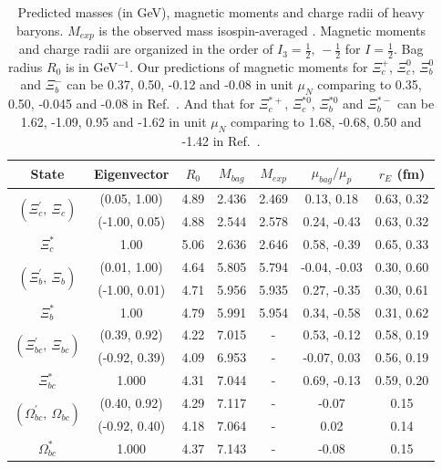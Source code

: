 \documentclass[12pt,prd,onecolumn,floatfix,nofootinbib]{revtex4}
\begin{document}
\renewcommand{\tabcolsep}{0.46cm} \renewcommand{\arraystretch}{1.1}
\begin{table}[!htb]
\caption{Predicted masses (in GeV), magnetic moments and charge radii of
heavy baryons. $M_{exp}$ is the observed mass isospin-averaged \protect\cite%
{Tanabashi:D18}. Magnetic moments and charge radii are organized in the
order of $I_{3}=\frac{1}{2},\,-\frac{1}{2}$ for $I=\frac{1}{2}$. Bag radius $%
R_{0}$ is in GeV$^{-1}$. Our predictions of magnetic moments for $\Xi_{c}^{+}$, 
$\Xi_{c}^{0}$, $\Xi_{b}^{0}$ and $\Xi_{b}^{-}$ can be 0.37, 0.50, -0.12 and 
-0.08 in unit $\mu_{N}$ comparing to 0.35, 0.50, -0.045 and -0.08 in Ref.~\cite%
{Aliev:2008ay}. And that for $\Xi_{c}^{\ast +}$, $\Xi_{c}^{\ast 0}$, 
$\Xi_{b}^{\ast 0}$ and $\Xi_{b}^{\ast -}$ can be 1.62, -1.09, 0.95 and -1.62 
in unit $\mu_{N}$ comparing to 1.68, -0.68, 0.50 and -1.42 in Ref.~\cite{Aliev:2008sk}.}
\label{tab:mixingbaryon}%
\begin{tabular}{ccccccc}
\hline\hline
\textrm{State} & \textrm{Eigenvector} & $R_{0}$ & $M_{bag}$ & $M_{exp}$ \cite%
{Tanabashi:D18} & $\mu_{bag}/\mu_{p}$ & $r_{E}$ (fm) \\ \hline
\multirow{2}{*}{$\left(\Xi_{c}^{\prime},\ \Xi_{c}\right)$} & (0.05, 1.00) &
4.89 & 2.436 & 2.469 & 0.13, 0.18 & 0.63, 0.32 \\
& (-1.00, 0.05) & 4.88 & 2.544 & 2.578 & 0.24, -0.43 & 0.63, 0.32 \\
$\Xi_{c}^{\ast}$ & 1.00 & 5.06 & 2.636 & 2.646 & 0.58, -0.39 & 0.65, 0.33 \\
\multirow{2}{*}{$\left(\Xi_{b}^{\prime},\ \Xi_{b}\right)$} & (0.01, 1.00) &
4.64 & 5.805 & 5.794 & -0.04, -0.03 & 0.30, 0.60 \\
& (-1.00, 0.01) & 4.71 & 5.956 & 5.935 & 0.27, -0.35 & 0.30, 0.61 \\
$\Xi_{b}^{\ast}$ & 1.00 & 4.79 & 5.991 & 5.954 & 0.34, -0.58 & 0.31, 0.62 \\
\multirow{2}{*}{$\left(\Xi_{bc}^{\prime},\ \Xi_{bc}\right)$} & (0.39, 0.92)
& 4.22 & 7.015 & - & 0.53, -0.12 & 0.58, 0.19 \\
& (-0.92, 0.39) & 4.09 & 6.953 & - & -0.07, 0.03 & 0.56, 0.19 \\
$\Xi_{bc}^{\ast}$ & 1.000 & 4.31 & 7.044 & - & 0.69, -0.13 & 0.59, 0.20 \\
\multirow{2}{*}{$\left(\Omega_{bc}^{\prime},\ \Omega_{bc}\right)$} & (0.40,
0.92) & 4.29 & 7.117 & - & -0.07 & 0.15 \\
& (-0.92, 0.40) & 4.18 & 7.064 & - & 0.02 & 0.14 \\
$\Omega_{bc}^{\ast}$ & 1.000 & 4.37 & 7.143 & - & -0.08 & 0.15 \\
\hline\hline
\end{tabular}%
\end{table}
\end{document}
